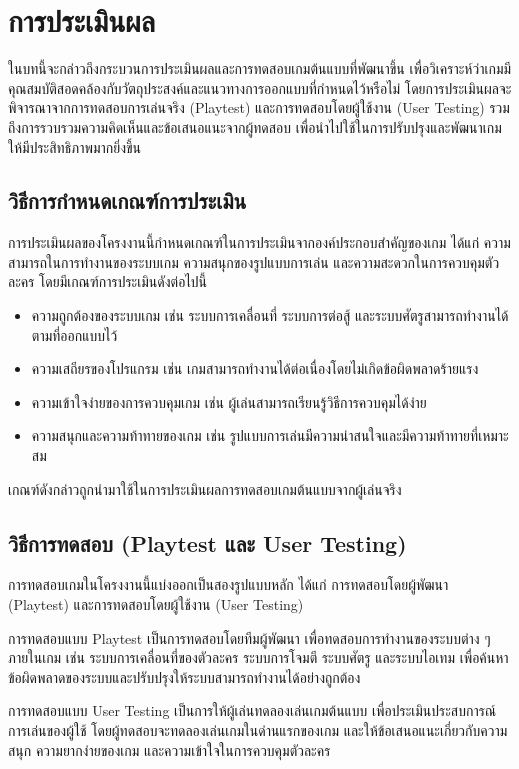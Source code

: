 \chapter{การประเมินผล}

ในบทนี้จะกล่าวถึงกระบวนการประเมินผลและการทดสอบเกมต้นแบบที่พัฒนาขึ้น เพื่อวิเคราะห์ว่าเกมมีคุณสมบัติสอดคล้องกับวัตถุประสงค์และแนวทางการออกแบบที่กำหนดไว้หรือไม่ โดยการประเมินผลจะพิจารณาจากการทดสอบการเล่นจริง (Playtest) และการทดสอบโดยผู้ใช้งาน (User Testing) รวมถึงการรวบรวมความคิดเห็นและข้อเสนอแนะจากผู้ทดสอบ เพื่อนำไปใช้ในการปรับปรุงและพัฒนาเกมให้มีประสิทธิภาพมากยิ่งขึ้น

\section{วิธีการกำหนดเกณฑ์การประเมิน}

การประเมินผลของโครงงานนี้กำหนดเกณฑ์ในการประเมินจากองค์ประกอบสำคัญของเกม ได้แก่ ความสามารถในการทำงานของระบบเกม ความสนุกของรูปแบบการเล่น และความสะดวกในการควบคุมตัวละคร โดยมีเกณฑ์การประเมินดังต่อไปนี้

\begin{itemize}
\item ความถูกต้องของระบบเกม เช่น ระบบการเคลื่อนที่ ระบบการต่อสู้ และระบบศัตรูสามารถทำงานได้ตามที่ออกแบบไว้
\item ความเสถียรของโปรแกรม เช่น เกมสามารถทำงานได้ต่อเนื่องโดยไม่เกิดข้อผิดพลาดร้ายแรง
\item ความเข้าใจง่ายของการควบคุมเกม เช่น ผู้เล่นสามารถเรียนรู้วิธีการควบคุมได้ง่าย
\item ความสนุกและความท้าทายของเกม เช่น รูปแบบการเล่นมีความน่าสนใจและมีความท้าทายที่เหมาะสม
\end{itemize}

เกณฑ์ดังกล่าวถูกนำมาใช้ในการประเมินผลการทดสอบเกมต้นแบบจากผู้เล่นจริง

\section{วิธีการทดสอบ (Playtest และ User Testing)}

การทดสอบเกมในโครงงานนี้แบ่งออกเป็นสองรูปแบบหลัก ได้แก่ การทดสอบโดยผู้พัฒนา (Playtest) และการทดสอบโดยผู้ใช้งาน (User Testing)

การทดสอบแบบ Playtest เป็นการทดสอบโดยทีมผู้พัฒนา เพื่อทดสอบการทำงานของระบบต่าง ๆ ภายในเกม เช่น ระบบการเคลื่อนที่ของตัวละคร ระบบการโจมตี ระบบศัตรู และระบบไอเทม เพื่อค้นหาข้อผิดพลาดของระบบและปรับปรุงให้ระบบสามารถทำงานได้อย่างถูกต้อง

การทดสอบแบบ User Testing เป็นการให้ผู้เล่นทดลองเล่นเกมต้นแบบ เพื่อประเมินประสบการณ์การเล่นของผู้ใช้ โดยผู้ทดสอบจะทดลองเล่นเกมในด่านแรกของเกม และให้ข้อเสนอแนะเกี่ยวกับความสนุก ความยากง่ายของเกม และความเข้าใจในการควบคุมตัวละคร

